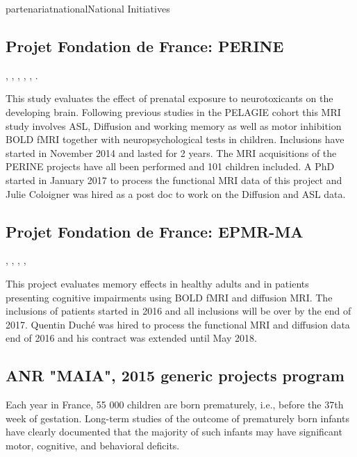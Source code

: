 \documentclass{ra2018}
\begin{document}
\begin{module}{partenariat}{national}{National Initiatives}

        \subsection{Projet Fondation de France: PERINE}
    \begin{participants}
      , 
      , 
      , 
      , 
      ,
      .
    \end{participants}
    This study evaluates the effect of prenatal exposure to neurotoxicants on the
    developing brain. Following previous studies in the PELAGIE cohort this MRI
    study involves ASL, Diffusion and working memory as well as motor inhibition
    BOLD fMRI together with neuropsychological tests in children. Inclusions have
    started in November 2014 and lasted for 2 years.  The MRI acquisitions of the
    PERINE projects have all been performed and 101 children included. A PhD started in January 2017 to process the functional MRI data of this
    project and Julie Coloigner was hired as a post doc to work on the Diffusion and ASL data.
    
    \subsection{Projet Fondation de France: EPMR-MA}
    \begin{participants}
      ,
      , 
      , 
      , 
    \end{participants}
    This project evaluates memory effects in healthy adults and in patients
    presenting cognitive impairments using BOLD fMRI and diffusion MRI. 
    The inclusions of patients started in 2016 and all inclusions will be over by the end of 2017. Quentin Duché was hired to process the functional MRI and diffusion data end of 2016 and his contract was extended until May 2018. 
       
        \subsection{ANR "MAIA", 2015 generic projects program}
        \label{sssec:anr_maia}
        \begin{participants}
        \end{participants}
        Each year in France, 55 000 children are born prematurely, i.e., before the
        37th week of gestation. Long-term studies of the outcome of prematurely born
        infants have clearly documented that the majority of such infants may have
        significant motor, cognitive, and behavioral deficits.
        

\end{module}
\end{document}
